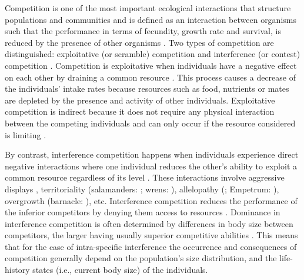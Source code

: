 Competition is one of the most important ecological interactions that structure
populations and communities and is defined as an interaction between organisms
such that the performance in terms of fecundity, growth rate and survival, is
reduced by the presence of other organisms
\autocites{volterra1931a,gause1932a,park1948a,park1954a,park1957a}. Two types of
competition are distinguished:
exploitative (or scramble) competition and interference (or contest) competition
\autocites{park1954a,park1962a,begon2009a}. Competition is exploitative when
individuals have a negative effect on each other by draining a common resource
\autocites{goss-custard1980a,vance1984a,begon2009a}. This process causes a
decrease of the individuals’ intake rates because resources such as food,
nutrients or mates \autocites{begon2009a} are depleted by the presence and activity
of other individuals. Exploitative competition is indirect because it does not
require any physical interaction between the competing individuals and can only
occur if the resource considered is limiting \autocites{begon2009a}.

By contrast, interference competition happens when individuals experience direct
negative interactions where one individual reduces the other’s ability to
exploit a common resource regardless of its level
\autocites{park1954a,vance1984a}.
These interactions involve aggressive displays \autocites{schoener1976a},
territoriality (salamanders: \textcite{walls1990a}; wrens:
\textcite{kennedy1996a}), allelopathy (\textcite{harper1977a,rice1984a};
Empetrum: \textcite{nilsson1994a}), overgrowth (barnacle:
\textcite{connell1961a,paine1966a}), etc.
Interference competition reduces the performance of the inferior competitors by
denying them access to resources \autocites{schoener1983a,thompson1993a}.
Dominance in interference competition is often determined by differences in body
size between competitors, the larger having usually superior competitive
abilities \autocites{mccormick2012a}. This means that for the case of
intra-specific interference the occurrence and consequences of competition
generally depend on the population’s size distribution, and the life-history
states (i.e., current body size) of the individuals.


